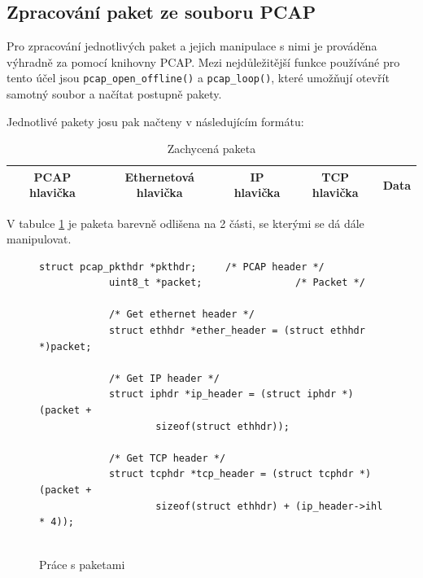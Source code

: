 \documentclass[11pt, a4paper, hidelinks]{article}[08.10.2023]
\begin{document}
    \subsection{Zpracování paket ze souboru PCAP}
    Pro zpracování jednotlivých paket a jejich manipulace s nimi je prováděna výhradně za pomocí knihovny PCAP. Mezi nejdůležitější funkce používáné pro tento účel jsou \texttt{pcap\_open\_offline()} a \texttt{pcap\_loop()}, které umožňují otevřít samotný soubor a načítat postupně pakety\cite{Pcap_open_offline}\cite{Pcap_loop}.

    Jednotlivé pakety josu pak načteny v následujícím formátu:
    \vspace{1cm}

    \begin{table}[H]
        \centering
         \begin{tabular}{|c|c|c|c|c|}
            \hline
                \color{red}PCAP hlavička  &  \color{blue}Ethernetová hlavička & \color{blue}IP hlavička & \color{blue}TCP hlavička & \color{blue}Data \\
            \hline
        \end{tabular}
        \caption{Zachycená paketa}
        \label{paketa}
    \end{table}

    \vspace{1cm}

    V tabulce \ref{paketa} je paketa barevně odlišena na 2 části, se kterými se dá dále manipulovat.
    \pagebreak

     \begin{figure}[H]
        \centering
        \begin{lstlisting}[style=CStyle]
            struct pcap_pkthdr *pkthdr;     /* PCAP header */
            uint8_t *packet;                /* Packet */

            /* Get ethernet header */
            struct ethhdr *ether_header = (struct ethhdr *)packet;

            /* Get IP header */
            struct iphdr *ip_header = (struct iphdr *)(packet + 
                    sizeof(struct ethhdr));

            /* Get TCP header */
            struct tcphdr *tcp_header = (struct tcphdr *)(packet + 
                    sizeof(struct ethhdr) + (ip_header->ihl * 4));
            
        \end{lstlisting}
        \caption{Práce s paketami}
        \label{paketa_c}
    \end{figure}
\end{document}
